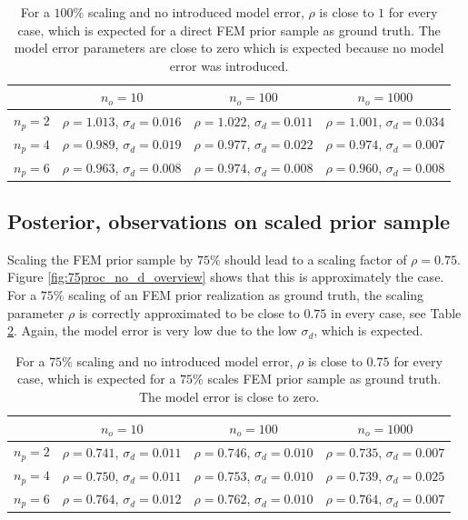 \documentclass[%
  a4paper,oneside,%
  11pt,%
  smallchapters,
  style=printdev,
  extramargin,
  green,%
  rgb, <cmyk>
  ]{tubsbook}
\begin{document}
\begin{table}[]
\centering\caption{For a $100\%$ scaling and no introduced model error, $\rho$ is close to $1$ for every case, which is expected for a direct FEM prior sample as ground truth. The model error parameters are close to zero which is expected because no model error was introduced.}
\label{tab:rho100p_nod}
\begin{tabular}{@{}cccc@{}}
\toprule
  & $n_o = 10$ & $n_o = 100$ & $n_o = 1000$ \\ \midrule
$n_p = 2$           & $\rho=1.013$, $\sigma_d=0.016$      & $\rho=1.022$, $\sigma_d=0.011$      & $\rho=1.001$, $\sigma_d=0.034$         \\
$n_p = 4$           & $\rho=0.989$, $\sigma_d=0.019$      & $\rho=0.977$, $\sigma_d=0.022$      & $\rho=0.974$, $\sigma_d=0.007$        \\
$n_p = 6$           & $\rho=0.963$, $\sigma_d=0.008$     & $\rho=0.974$, $\sigma_d=0.008$      & $\rho=0.960$, $\sigma_d=0.008$        \\ \bottomrule
\end{tabular}
\end{table}
%
\FloatBarrier


\subsection{Posterior, observations on scaled prior sample}
\label{sec:scaled2D}
Scaling the FEM prior sample by $75\%$ should lead to a scaling factor of $\rho = 0.75$. Figure \ref{fig:75proc_no_d_overview} shows that this is approximately the case.
For a $75\%$ scaling of an FEM prior realization as ground truth, the scaling parameter $\rho$ is correctly approximated to be close to $0.75$ in every case, see Table \ref{tab:rho75p_nod}. Again, the model error is very low due to the low $\sigma_d$, which is expected.
\begin{table}[]
\centering
\caption{For a $75\%$ scaling and no introduced model error, $\rho$ is close to $0.75$ for every case, which is expected for a $75 \%$ scales FEM prior sample as ground truth. The model error is close to zero.}
\label{tab:rho75p_nod}
\begin{tabular}{@{}cccc@{}}
\toprule
  & $n_o = 10$ & $n_o = 100$ & $n_o = 1000$ \\ \midrule
$n_p = 2$           & $\rho=0.741$, $\sigma_d=0.011$      & $\rho=0.746$, $\sigma_d=0.010$      & $\rho=0.735$, $\sigma_d=0.007$         \\
$n_p = 4$           & $\rho=0.750$, $\sigma_d=0.011$      & $\rho=0.753$, $\sigma_d=0.010$      & $\rho=0.739$, $\sigma_d=0.025$        \\
$n_p = 6$           & $\rho=0.764$, $\sigma_d=0.012$     & $\rho=0.762$, $\sigma_d=0.010$      & $\rho=0.764$, $\sigma_d=0.007$        \\ \bottomrule
\end{tabular}
\end{table}
%
\end{document}
